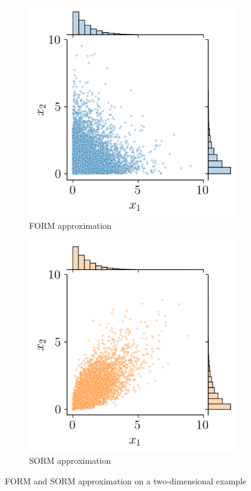 \begin{figure}[ht]
    \centering
    \begin{subfigure}[b]{0.32\textwidth}
        \centering
        \includegraphics[width=\textwidth, draft]{../numerical_experiments/chapter1/figures/independent_copula.png}
        \caption{FORM approximation}
    \end{subfigure}
    \quad
    \begin{subfigure}[b]{0.32\textwidth}
        \centering
        \includegraphics[width=\textwidth, draft]{../numerical_experiments/chapter1/figures/normal_copula.png}
        \caption{SORM approximation}
    \end{subfigure}
       \caption{FORM and SORM approximation on a two-dimensional example}
       \label{fig:FORM_SORM_approx}
\end{figure}


